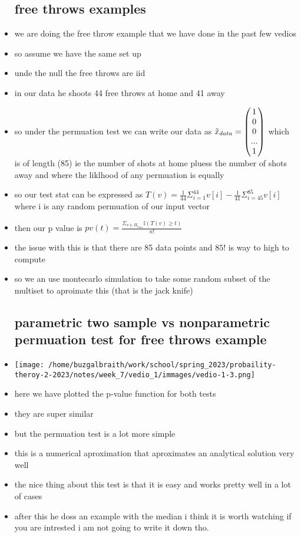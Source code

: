 \documentclass{article}
\begin{document}
\begin{itemize}
\subsection{free throws examples}
\item we are doing the free throw example that we have done in the past few vedios
\item so assume we have the same set up
\item unde the null the free throws are iid 
\item in our data he shoots 44 free throws at home and 41 away
\item so under the permuation test we can write our data as $\Tilde{x}_{data}=\begin{pmatrix}
   1\\0\\0\\...\\1 
\end{pmatrix}$ which is of length (85) ie the number of shots at home pluess the number of shots away and where the liklhood of any permuation is equally
\item so our test stat can be expressed as $T(v)=\frac{1}{44}\Sigma_{i=1}^{44}v[i]-\frac{1}{41}\Sigma_{i=45}^{85}v[i]$ where i is any random permuation of our input vector 
\item then our p value is $pv(t)=\frac{\Sigma_{v\in \Pi_{x_{data}}}\mathbb{I}(T(v)\geq t)}{n!}$

\item the issue with this is that there are 85 data points and $85!$ is way to high to compute 
\item so we an use montecarlo simulation to take some random subset of the multiset to aproimate this (that is the jack knife)
\subsection{parametric two sample vs nonparametric permuation test for free throws example}
\item \texttt{[image: /home/buzgalbraith/work/school/spring\_2023/probaility-theroy-2-2023/notes/week\_7/vedio\_1/immages/vedio-1-3.png]}
\item here we have plotted the p-value function for both tests 
\item they are super similar 
\item but the permuation test is a lot more simple 
\item this is a numerical aproximation that aproximates an analytical solution very well 
\item the nice thing about this test is that it is easy and works pretty well in a lot of cases 
\item after this he doss an example with the median i think it is worth watching if you are intrested i am not going to write it down tho. 



\end{itemize}
\end{document}
